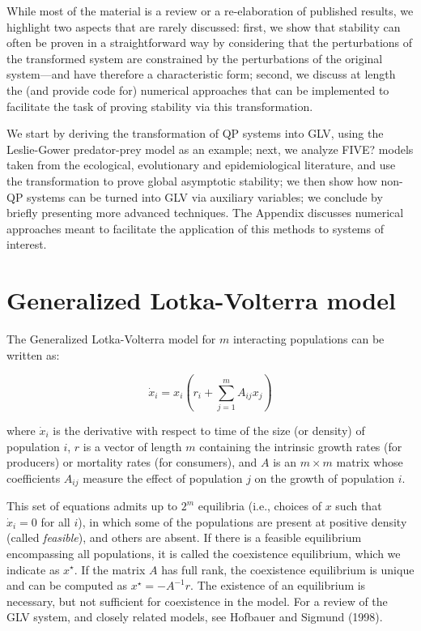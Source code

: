 \documentclass{article}
\begin{document}
While most of the material is a review or a re-elaboration of published
results, we highlight two aspects that are rarely discussed: first, we
show that stability can often be proven in a straightforward way by
considering that the perturbations of the transformed system are
constrained by the perturbations of the original system---and have
therefore a characteristic form; second, we discuss at length the (and
provide code for) numerical approaches that can be implemented to
facilitate the task of proving stability via this transformation.

We start by deriving the transformation of QP systems into GLV, using
the Leslie-Gower predator-prey model as an example; next, we analyze
FIVE? models taken from the ecological, evolutionary and epidemiological
literature, and use the transformation to prove global asymptotic
stability; we then show how non-QP systems can be turned into GLV via
auxiliary variables; we conclude by briefly presenting more advanced
techniques. The Appendix discusses numerical approaches meant to
facilitate the application of this methods to systems of interest.

\hypertarget{generalized-lotka-volterra-model}{%
\section{Generalized Lotka-Volterra
model}\label{generalized-lotka-volterra-model}}

\label{sec:glv}

The Generalized Lotka-Volterra model for \(m\) interacting populations
can be written as:

\begin{equation}
\label{eq:glv}
\dot{x}_i = x_i \left(r_i + \sum_{j=1}^m A_{ij} x_j \right)
\end{equation}

where \(\dot{x}_i\) is the derivative with respect to time of the size
(or density) of population \(i\), \(r\) is a vector of length \(m\)
containing the intrinsic growth rates (for producers) or mortality rates
(for consumers), and \(A\) is an \(m \times m\) matrix whose
coefficients \(A_{ij}\) measure the effect of population \(j\) on the
growth of population \(i\).

This set of equations admits up to \(2^m\) equilibria (i.e., choices of
\(x\) such that \(\dot{x}_i = 0\) for all \(i\)), in which some of the
populations are present at positive density (called \emph{feasible}),
and others are absent. If there is a feasible equilibrium encompassing
all populations, it is called the coexistence equilibrium, which we
indicate as \(x^\star\). If the matrix \(A\) has full rank, the
coexistence equilibrium is unique and can be computed as
\(x^\star = -A^{-1}r\). The existence of an equilibrium is necessary,
but not sufficient for coexistence in the model. For a review of the GLV
system, and closely related models, see Hofbauer and Sigmund (1998).
\end{document}
